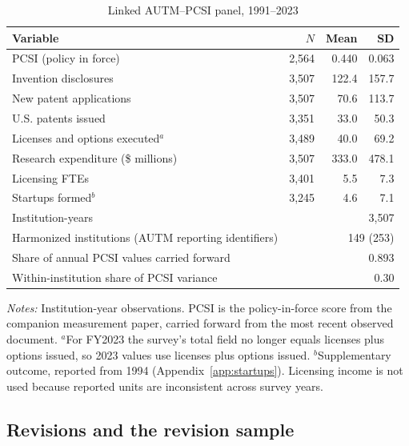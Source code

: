 \begin{table}[htbp]\centering
\caption{Linked AUTM--PCSI panel, 1991--2023}\label{tab:descriptives}
\begin{threeparttable}\small\begin{tabular}{lrrr}\toprule
Variable & $N$ & Mean & SD \\\midrule
PCSI (policy in force) & 2,564 & 0.440 & 0.063 \\
Invention disclosures & 3,507 & 122.4 & 157.7 \\
New patent applications & 3,507 & 70.6 & 113.7 \\
U.S. patents issued & 3,351 & 33.0 & 50.3 \\
Licenses and options executed$^{a}$ & 3,489 & 40.0 & 69.2 \\
Research expenditure (\$ millions) & 3,507 & 333.0 & 478.1 \\
Licensing FTEs & 3,401 & 5.5 & 7.3 \\
Startups formed$^{b}$ & 3,245 & 4.6 & 7.1 \\
\midrule
Institution-years & \multicolumn{3}{r}{3,507} \\
Harmonized institutions (AUTM reporting identifiers) & \multicolumn{3}{r}{149 (253)} \\
Share of annual PCSI values carried forward & \multicolumn{3}{r}{0.893} \\
Within-institution share of PCSI variance & \multicolumn{3}{r}{0.30} \\
\bottomrule\end{tabular}
\begin{tablenotes}[flushleft]\footnotesize
\item \textit{Notes:} Institution-year observations. PCSI is the policy-in-force score from the companion measurement paper, carried forward from the most recent observed document. $^{a}$For FY2023 the survey's total field no longer equals licenses plus options issued, so 2023 values use licenses plus options issued. $^{b}$Supplementary outcome, reported from 1994 (Appendix~\ref{app:startups}). Licensing income is not used because reported units are inconsistent across survey years.
\end{tablenotes}\end{threeparttable}\end{table}

\subsection{Revisions and the revision sample}

